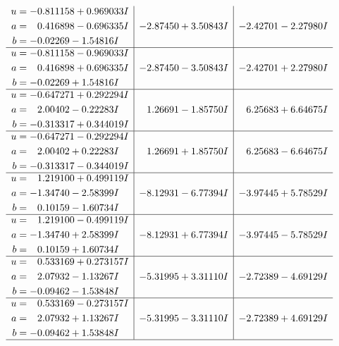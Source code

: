 \documentclass[1p]{elsarticle_modified}
\theoremstyle{definition}
\begin{document}
$$\begin{array}{c|c|c}
\begin{aligned}
u &= -0.811158 + 0.969033 I \\
a &= \phantom{-}0.416898 - 0.696335 I \\
b &= -0.02269 - 1.54816 I\end{aligned}
 & -2.87450 + 3.50843 I & -2.42701 - 2.27980 I \\ \hline\begin{aligned}
u &= -0.811158 - 0.969033 I \\
a &= \phantom{-}0.416898 + 0.696335 I \\
b &= -0.02269 + 1.54816 I\end{aligned}
 & -2.87450 - 3.50843 I & -2.42701 + 2.27980 I \\ \hline\begin{aligned}
u &= -0.647271 + 0.292294 I \\
a &= \phantom{-}2.00402 - 0.22283 I \\
b &= -0.313317 + 0.344019 I\end{aligned}
 & \phantom{-}1.26691 - 1.85750 I & \phantom{-}6.25683 + 6.64675 I \\ \hline\begin{aligned}
u &= -0.647271 - 0.292294 I \\
a &= \phantom{-}2.00402 + 0.22283 I \\
b &= -0.313317 - 0.344019 I\end{aligned}
 & \phantom{-}1.26691 + 1.85750 I & \phantom{-}6.25683 - 6.64675 I \\ \hline\begin{aligned}
u &= \phantom{-}1.219100 + 0.499119 I \\
a &= -1.34740 - 2.58399 I \\
b &= \phantom{-}0.10159 - 1.60734 I\end{aligned}
 & -8.12931 - 6.77394 I & -3.97445 + 5.78529 I \\ \hline\begin{aligned}
u &= \phantom{-}1.219100 - 0.499119 I \\
a &= -1.34740 + 2.58399 I \\
b &= \phantom{-}0.10159 + 1.60734 I\end{aligned}
 & -8.12931 + 6.77394 I & -3.97445 - 5.78529 I \\ \hline\begin{aligned}
u &= \phantom{-}0.533169 + 0.273157 I \\
a &= \phantom{-}2.07932 - 1.13267 I \\
b &= -0.09462 - 1.53848 I\end{aligned}
 & -5.31995 + 3.31110 I & -2.72389 - 4.69129 I \\ \hline\begin{aligned}
u &= \phantom{-}0.533169 - 0.273157 I \\
a &= \phantom{-}2.07932 + 1.13267 I \\
b &= -0.09462 + 1.53848 I\end{aligned}
 & -5.31995 - 3.31110 I & -2.72389 + 4.69129 I\\
 \hline 
 \end{array}$$\newpage
\end{document}
